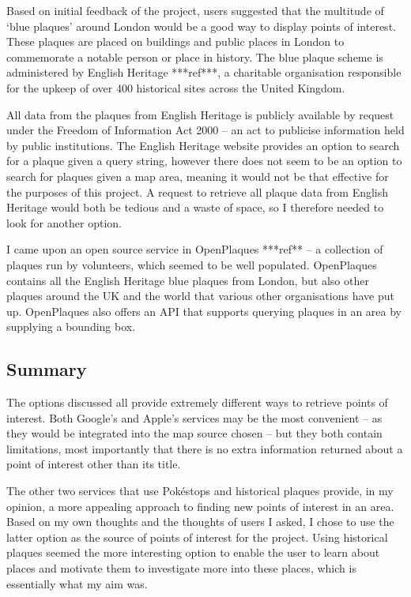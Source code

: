Based on initial feedback of the project, users suggested that the multitude of `blue plaques' around London would be a good way to display points of interest. These plaques are placed on buildings and public places in London to commemorate a notable person or place in history. The blue plaque scheme is administered by English Heritage ***ref***, a charitable organisation responsible for the upkeep of over 400 historical sites across the United Kingdom.

All data from the plaques from English Heritage is publicly available by request under the Freedom of Information Act 2000 -- an act to publicise information held by public institutions. The English Heritage website provides an option to search for a plaque given a query string, however there does not seem to be an option to search for plaques given a map area, meaning it would not be that effective for the purposes of this project. A request to retrieve all plaque data from English Heritage would both be tedious and a waste of space, so I therefore needed to look for another option.

I came upon an open source service in OpenPlaques ***ref** -- a collection of plaques run by volunteers, which seemed to be well populated. OpenPlaques contains all the English Heritage blue plaques from London, but also other plaques around the UK and the world that various other organisations have put up. OpenPlaques also offers an API that supports querying plaques in an area by supplying a bounding box.

\subsection{Summary}

The options discussed all provide extremely different ways to retrieve points of interest. Both Google's and Apple's services may be the most convenient -- as they would be integrated into the map source chosen -- but they both contain limitations, most importantly that there is no extra information returned about a point of interest other than its title.

The other two services that use Pok\'{e}stops and historical plaques provide, in my opinion, a more appealing approach to finding new points of interest in an area. Based on my own thoughts and the thoughts of users I asked, I chose to use the latter option as the source of points of interest for the project. Using historical plaques seemed the more interesting option to enable the user to learn about places and motivate them to investigate more into these places, which is essentially what my aim was.

